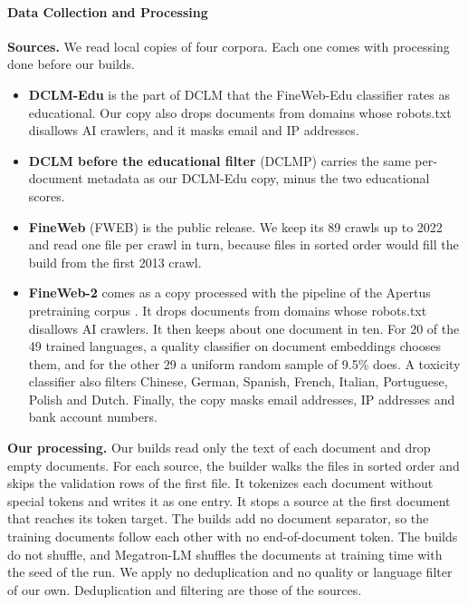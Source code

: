 \paragraph{Data Collection and Processing}

\textbf{Sources.} We read local copies of four corpora. Each one comes with processing done before our builds.
\begin{itemize}[itemsep=1pt,topsep=2pt]
    \item \textbf{DCLM-Edu} \citep{allal_smollm2_2025} is the part of DCLM \citep{li_datacomp-lm_2025} that the FineWeb-Edu classifier \citep{lozhkov_fineweb-edu_2024} rates as educational. Our copy also drops documents from domains whose robots.txt disallows AI crawlers, and it masks email and IP addresses.
    \item \textbf{DCLM before the educational filter} (DCLMP) carries the same per-document metadata as our DCLM-Edu copy, minus the two educational scores.
    \item \textbf{FineWeb} \citep{penedo_fineweb_2024} (FWEB) is the public release. We keep its 89 crawls up to 2022 and read one file per crawl in turn, because files in sorted order would fill the build from the first 2013 crawl.
    \item \textbf{FineWeb-2} \citep{penedo_fineweb2_2025} comes as a copy processed with the pipeline of the Apertus pretraining corpus \citep{apertus_apertus_2025}. It drops documents from domains whose robots.txt disallows AI crawlers. It then keeps about one document in ten. For 20 of the 49 trained languages, a quality classifier on document embeddings \citep{messmer_enhancing_2026} chooses them, and for the other 29 a uniform random sample of 9.5\% does. A toxicity classifier also filters Chinese, German, Spanish, French, Italian, Portuguese, Polish and Dutch. Finally, the copy masks email addresses, IP addresses and bank account numbers.
\end{itemize}

\textbf{Our processing.} Our builds read only the text of each document and drop empty documents. For each source, the builder walks the files in sorted order and skips the validation rows of the first file. It tokenizes each document without special tokens and writes it as one entry. It stops a source at the first document that reaches its token target. The builds add no document separator, so the training documents follow each other with no end-of-document token. The builds do not shuffle, and Megatron-LM shuffles the documents at training time with the seed of the run. We apply no deduplication and no quality or language filter of our own. Deduplication and filtering are those of the sources.

